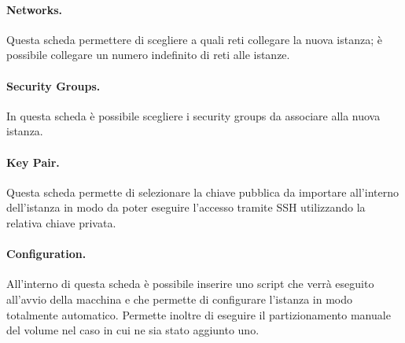 \paragraph{Networks.}
Questa scheda permettere di scegliere a quali reti collegare la nuova istanza; è possibile collegare un numero indefinito di reti alle istanze.

\paragraph{Security Groups.}
In questa scheda è possibile scegliere i security groups da associare alla nuova istanza.

\paragraph{Key Pair.}
Questa scheda permette di selezionare la chiave pubblica da importare all'interno dell'istanza in modo da poter eseguire l'accesso tramite SSH utilizzando la relativa chiave privata.

\paragraph{Configuration.}
All'interno di questa scheda è possibile inserire uno script che verrà eseguito all'avvio della macchina e che permette di configurare l'istanza in modo totalmente automatico. Permette inoltre di eseguire il partizionamento manuale del volume nel caso in cui ne sia stato aggiunto uno.
